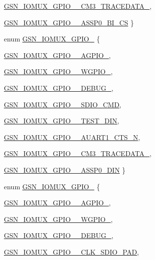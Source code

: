 \begin{DoxyCompactItemize}
\hyperlink{a00519_a86bd2b64215669b8a05236cfa417de58acbd77f5edcca121d7424f8ed20d4baff}{GSN\_\-IOMUX\_\-GPIO\_\_\-CM3\_\-TRACEDATA\_}, 
\par
\hyperlink{a00519_a86bd2b64215669b8a05236cfa417de58a24000b585c2045de6171afbe4cdca752}{GSN\_\-IOMUX\_\-GPIO\_\_\-ASSP0\_\-BI\_\-CS}
 \}
\item 
enum \hyperlink{a00519_aecca35d9cd508e28ee93f3be3ee7dd58}{GSN\_\-IOMUX\_\-GPIO\_} \{ \par
\hyperlink{a00519_aecca35d9cd508e28ee93f3be3ee7dd58a0d0a7a69374b234db9fe751a6f2ef001}{GSN\_\-IOMUX\_\-GPIO\_\_\-AGPIO\_}, 
\par
\hyperlink{a00519_aecca35d9cd508e28ee93f3be3ee7dd58a18e7631131599bde2a4b4ae717086447}{GSN\_\-IOMUX\_\-GPIO\_\_\-WGPIO\_}, 
\par
\hyperlink{a00519_aecca35d9cd508e28ee93f3be3ee7dd58ace8ffdfc98d61405fa97c6e38f758a12}{GSN\_\-IOMUX\_\-GPIO\_\_\-DEBUG\_}, 
\par
\hyperlink{a00519_aecca35d9cd508e28ee93f3be3ee7dd58a842183434753cb0c0d130028bbd2f46e}{GSN\_\-IOMUX\_\-GPIO\_\_\-SDIO\_\-CMD}, 
\par
\hyperlink{a00519_aecca35d9cd508e28ee93f3be3ee7dd58a582e0eaca9f375ca5d6fa1a9d1677f47}{GSN\_\-IOMUX\_\-GPIO\_\_\-TEST\_\-DIN}, 
\par
\hyperlink{a00519_aecca35d9cd508e28ee93f3be3ee7dd58a1a21d86b082e5db918eafaa0488ef79d}{GSN\_\-IOMUX\_\-GPIO\_\_\-AUART1\_\-CTS\_\-N}, 
\par
\hyperlink{a00519_aecca35d9cd508e28ee93f3be3ee7dd58aeeb940206f41f2162764d1b0c5b34434}{GSN\_\-IOMUX\_\-GPIO\_\_\-CM3\_\-TRACEDATA\_}, 
\par
\hyperlink{a00519_aecca35d9cd508e28ee93f3be3ee7dd58ae43048d5181f366aaa7e17ac83db9a04}{GSN\_\-IOMUX\_\-GPIO\_\_\-ASSP0\_\-DIN}
 \}
\item 
enum \hyperlink{a00519_a959c5ad68f54cc1d3cc77fb390107d74}{GSN\_\-IOMUX\_\-GPIO\_} \{ \par
\hyperlink{a00519_a959c5ad68f54cc1d3cc77fb390107d74a11c5efc30d70cd80fb47432aa158386d}{GSN\_\-IOMUX\_\-GPIO\_\_\-AGPIO\_}, 
\par
\hyperlink{a00519_a959c5ad68f54cc1d3cc77fb390107d74a4c6a2990445f0796616347e7df65800a}{GSN\_\-IOMUX\_\-GPIO\_\_\-WGPIO\_}, 
\par
\hyperlink{a00519_a959c5ad68f54cc1d3cc77fb390107d74a4b9251d4c2f73ea4635abd0745c3c6ca}{GSN\_\-IOMUX\_\-GPIO\_\_\-DEBUG\_}, 
\par
\hyperlink{a00519_a959c5ad68f54cc1d3cc77fb390107d74a3192db61dc4807cce073fe70a94978aa}{GSN\_\-IOMUX\_\-GPIO\_\_\-CLK\_\-SDIO\_\-PAD}, 

\end{DoxyCompactItemize}

